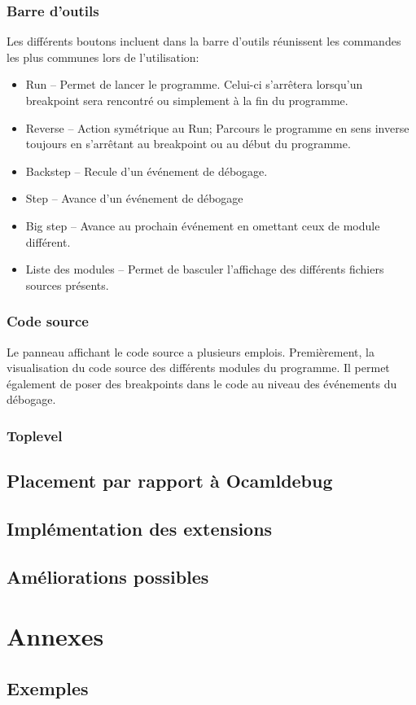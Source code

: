 \documentclass[11pt,a4paper]{report}
\begin{document}
\subsection{Barre d'outils}

Les différents boutons incluent dans la barre d'outils réunissent les commandes les plus communes lors de l'utilisation:
\begin{itemize}
\item Run -- Permet de lancer le programme. Celui-ci s'arrêtera lorsqu'un breakpoint sera rencontré ou simplement à la fin du programme.
\item Reverse -- Action symétrique au Run; Parcours le programme en sens inverse toujours en s'arrêtant au breakpoint ou au début du programme.
\item Backstep -- Recule d'un événement de débogage.
\item Step -- Avance d'un événement de débogage
\item Big step -- Avance au prochain événement en omettant ceux de module différent.
\item Liste des modules -- Permet de basculer l'affichage des différents fichiers sources présents.
\end{itemize}

\subsection{Code source}

Le panneau affichant le code source a plusieurs emplois. Premièrement, la visualisation
du code source des différents modules du programme. Il permet également de poser des
breakpoints dans le code au niveau des événements du débogage.


\subsection{Toplevel}


\section{Placement par rapport à Ocamldebug}
\section{Implémentation des extensions}
\section{Améliorations possibles}


\chapter{Annexes}

\section{Exemples}
\end{document}
